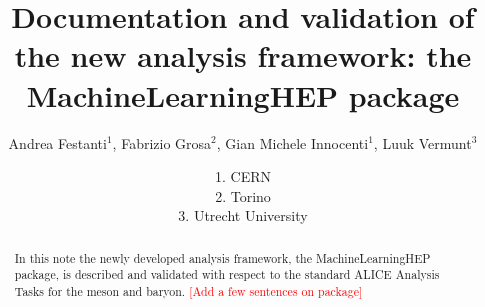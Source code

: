 \documentclass[ALICE,manyauthors]{ALICE_analysis_notes}
\begin{document}
%

\linenumbers

%
%
\begin{titlepage}
%
\PHdate{\today}
%
\title{Documentation and validation of the new analysis framework: the MachineLearningHEP package}
%
\author{Andrea Festanti$^{1}$, Fabrizio Grosa$^{2}$, Gian Michele Innocenti$^{1}$, Luuk Vermunt$^{3}$}
\author{
1. CERN\\
2. Torino\\
3. Utrecht University\\
}
%
%
\begin{abstract}
In this note the newly developed analysis framework, the MachineLearningHEP package, is described and validated with respect to the standard ALICE Analysis Tasks for the \Ds meson and \Lc baryon. \textcolor{red}{[Add a few sentences on package]}
\end{abstract}
\end{titlepage}
\setcounter{page}{2}
%
\clearpage
{}
\tableofcontents
\clearpage
\clearpage
 
\clearpage


\end{document}
